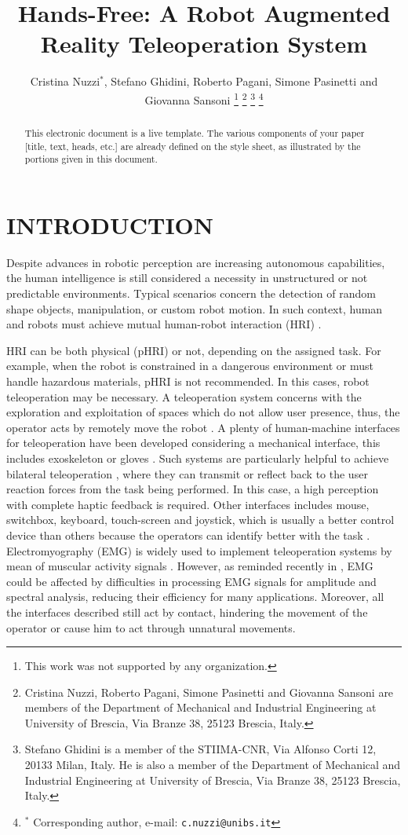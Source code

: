 \documentclass[letterpaper, 10 pt, conference]{ieeeconf}  %
\title{\LARGE \bf
Hands-Free: A Robot Augmented Reality Teleoperation System
}
\author{Cristina Nuzzi$^{*}$, Stefano Ghidini, Roberto Pagani, Simone Pasinetti and Giovanna Sansoni %
\thanks{This work was not supported by any organization.}%
\thanks{Cristina Nuzzi, Roberto Pagani, Simone Pasinetti and Giovanna Sansoni are members of the Department of Mechanical and Industrial Engineering at University of Brescia, Via Branze 38, 25123 Brescia, Italy.}
\thanks{Stefano Ghidini is a member of the STIIMA-CNR, Via Alfonso Corti 12, 20133 Milan, Italy. He is also a member of the Department of Mechanical and Industrial Engineering at University of Brescia, Via Branze 38, 25123 Brescia, Italy.}
\thanks{$^{*}$ Corresponding author, e-mail: {\tt\small c.nuzzi@unibs.it}}%
}
\begin{document}
\maketitle
\thispagestyle{empty}
\pagestyle{empty}

\begin{abstract}

This electronic document is a live template. The various components of your paper [title, text, heads, etc.] are already defined on the style sheet, as illustrated by the portions given in this document.

\end{abstract}


\section{INTRODUCTION}
Despite advances in robotic perception are increasing autonomous capabilities, the human intelligence is still considered a necessity in unstructured or not predictable environments. Typical scenarios concern the detection of random shape objects, manipulation, or custom robot motion. In such context, human and robots must achieve mutual human-robot interaction (HRI) \cite{Yanco2002}.

HRI can be both physical (pHRI) or not, depending on the assigned task. For example, when the robot is constrained in a dangerous environment or must handle hazardous materials, pHRI is not recommended. In this cases, robot teleoperation may be necessary. A teleoperation system concerns with the exploration and exploitation of spaces which do not allow user presence, thus, the operator acts by remotely move the robot \cite{VERTUTJean}. A plenty of human-machine interfaces for teleoperation have been developed considering a mechanical interface, this includes exoskeleton \cite{Rebelo2014} or gloves \cite{Lv2006}. Such systems are particularly helpful to achieve bilateral teleoperation \cite{Hokayem2006}, where they can transmit or reflect back to the user reaction forces from the task being performed. In this case, a high perception with complete haptic feedback \cite{Glover2009} is required. Other interfaces includes mouse, switchbox, keyboard, touch-screen and joystick, which is usually a better control device than others because the operators can identify better with the task \cite{Boboc2012}. Electromyography (EMG) is widely used to implement teleoperation systems by mean of muscular activity signals \cite{Vogel2011, Hassan2019}. However, as reminded recently in \cite{Roveda2018a}, EMG could be affected by difficulties in processing EMG signals for amplitude and spectral analysis, reducing their efficiency for many applications. Moreover, all the interfaces described still act by contact, hindering the movement of the operator or cause him to act through unnatural movements.
\end{document}
